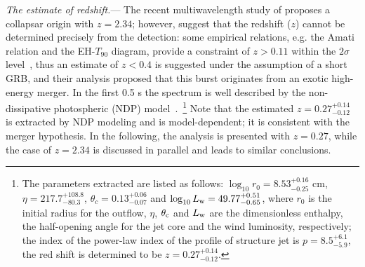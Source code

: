 \documentclass[linenumbers,twocolumn]{aastex631}
\begin{document}
 


\textit{The estimate of redshift.}--- The recent multiwavelength study of \cite{2026MNRAS.548ag555P} proposes a collapsar origin with $z=2.34$; however, \cite{2023MNRAS.522.5204B} suggest that the redshift ($z$) cannot be determined precisely from the detection: some empirical relations, e.g. the Amati relation and the EH-$T_{90}$ diagram, provide a constraint of $z>0.11$ within the $2\sigma$ level~\citep{2021GCN.30452....1M}, thus an estimate of $z<0.4$ is suggested under the assumption of a short GRB, and their analysis proposed that this burst originates from an exotic high-energy merger. In the first 0.5 s the spectrum is well described by the non-dissipative photospheric (NDP) model~\citep[e.g.,][]{2013A,Deng_2014,2022MNRAS.512.5693S,2022ApJ...931..112S}.~\footnote{The parameters extracted are listed as follows: $\log_{10} r_0=8.53^{+0.16}_{-0.25}$ cm, $\eta=217.7^{+108.8}_{-80.3}$, $\theta_c=0.13^{+0.06}_{-0.07}$ and $\log_{10} L_{\rm w}=49.77^{+0.51}_{-0.65}$, where $r_0$ is the initial radius for the outflow, $\eta$, $\theta_{\rm c}$ and $L_{\rm w}$ are the dimensionless enthalpy, the half-opening angle for the jet core and the wind luminosity, respectively; the index of the power-law index of the profile of structure jet is $p=8.5^{+6.1}_{-5.9}$, the red shift is determined to be $z=0.27^{+0.14}_{-0.12}$.}
Note that the estimated $z=0.27^{+0.14}_{-0.12}$ is extracted by NDP modeling and is model-dependent; it is consistent with the merger hypothesis. In the following, the analysis is presented with $z=0.27$, while the case of $z=2.34$ is discussed in parallel and leads to similar conclusions.
\end{document}
